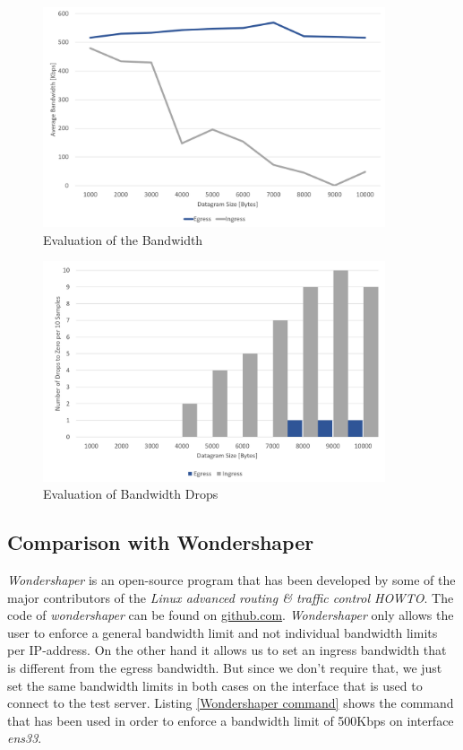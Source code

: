\begin{figure}[h]
	\centering
	\includegraphics[width=0.9\textwidth]{img/Evaluation-Bandwidth.png}
	\caption{Evaluation of the Bandwidth}
	\label{Evaluation of the Bandwidth}
\end{figure}

\begin{figure}[h]
	\centering
	\includegraphics[width=0.9\textwidth]{img/Evaluation-Zeros.png}
	\caption{Evaluation of Bandwidth Drops}
	\label{Evaluation of the Bandwidth Drops}
\end{figure}

\newpage
\textit{ }
\newpage

\subsection{Comparison with Wondershaper}

\textit{Wondershaper} is an open-source program that has been developed by some of the major contributors of the \textit{Linux advanced routing \& traffic control HOWTO}\cite
{hubert2002linux}. The code of \textit{wondershaper} can be found on \href{https://github.com/magnific0/wondershaper}{github.com}\cite{hubert2002wondershaper}. \textit{Wondershaper} only allows the user to enforce a general bandwidth limit and not individual bandwidth limits per \acs{IP}-address. On the other hand it allows us to set an ingress bandwidth that is different from the egress bandwidth. But since we don't require that, we just set the same bandwidth limits in both cases on the interface that is used to connect to the test server. Listing \ref{Wondershaper command} shows the command that has been used in order to enforce a bandwidth limit of 500Kbps on interface \textit{ens33}.

